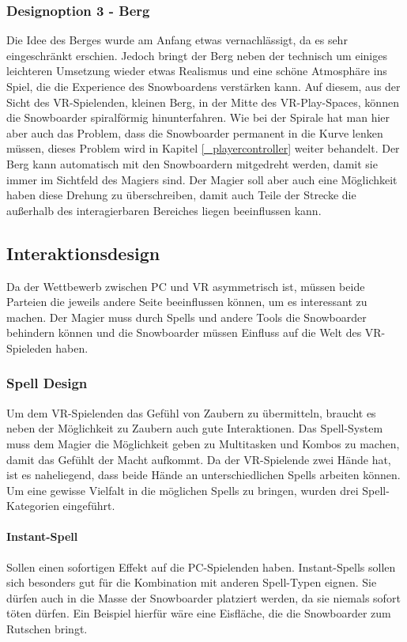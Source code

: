 \subsubsection{Designoption 3 - Berg}
Die Idee des Berges wurde am Anfang etwas vernachlässigt, da es sehr eingeschränkt erschien. Jedoch bringt der Berg neben der technisch um einiges leichteren Umsetzung wieder etwas Realismus und eine schöne Atmosphäre ins Spiel, die die Experience des Snowboardens verstärken kann. Auf diesem, aus der Sicht des VR-Spielenden, kleinen Berg, in der Mitte des VR-Play-Spaces, können die Snowboarder spiralförmig hinunterfahren. Wie bei der Spirale hat man hier aber auch das Problem, dass die Snowboarder permanent in die Kurve lenken müssen, dieses Problem wird in Kapitel \ref{_playercontroller} weiter behandelt. Der Berg kann automatisch mit den Snowboardern mitgedreht werden, damit sie immer im Sichtfeld des Magiers sind. Der Magier soll aber auch eine Möglichkeit haben diese Drehung zu überschreiben, damit auch Teile der Strecke die außerhalb des interagierbaren Bereiches liegen beeinflussen kann.

\subsection{Interaktionsdesign}
Da der Wettbewerb zwischen PC und VR asymmetrisch ist, müssen beide Parteien die jeweils andere Seite beeinflussen können, um es interessant zu machen. Der Magier muss durch Spells und andere Tools die Snowboarder behindern können und die Snowboarder müssen Einfluss auf die Welt des VR-Spieleden haben.

\subsubsection{Spell Design\label{_spell_design}}
Um dem VR-Spielenden das Gefühl von Zaubern zu übermitteln, braucht es neben der Möglichkeit zu Zaubern auch gute Interaktionen. Das Spell-System muss dem Magier die Möglichkeit geben zu Multitasken und Kombos zu machen, damit das Gefühlt der Macht aufkommt. Da der VR-Spielende zwei Hände hat, ist es naheliegend, dass beide Hände an unterschiedlichen Spells arbeiten können. Um eine gewisse Vielfalt in die möglichen Spells zu bringen, wurden drei Spell-Kategorien eingeführt.

\paragraph{Instant-Spell}
Sollen einen sofortigen Effekt auf die PC-Spielenden haben. Instant-Spells sollen sich besonders gut für die Kombination mit anderen Spell-Typen eignen. Sie dürfen auch in die Masse der Snowboarder platziert werden, da sie niemals sofort töten dürfen. Ein Beispiel hierfür wäre eine Eisfläche, die die Snowboarder zum Rutschen bringt.

